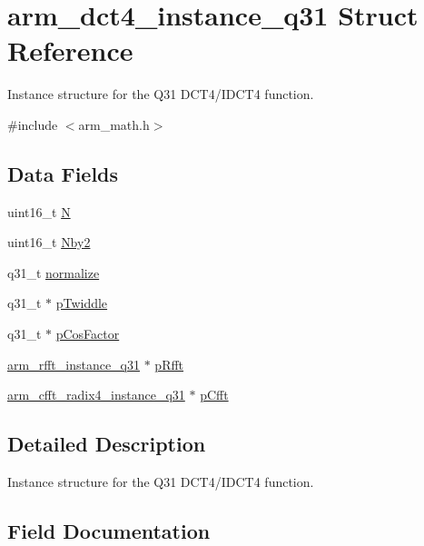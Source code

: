 \hypertarget{structarm__dct4__instance__q31}{}\section{arm\+\_\+dct4\+\_\+instance\+\_\+q31 Struct Reference}
\label{structarm__dct4__instance__q31}


Instance structure for the Q31 D\+C\+T4/\+I\+D\+C\+T4 function.  




{\ttfamily \#include $<$arm\+\_\+math.\+h$>$}

\subsection*{Data Fields}
\begin{DoxyCompactItemize}
\item 
uint16\+\_\+t \hyperlink{structarm__dct4__instance__q31_a37d49571fe35012087153c093705cd11}{N}
\item 
uint16\+\_\+t \hyperlink{structarm__dct4__instance__q31_afa64b1618089e35c2b55cff71cb29715}{Nby2}
\item 
q31\+\_\+t \hyperlink{structarm__dct4__instance__q31_a3a2f571658a202a38fa508098001b47c}{normalize}
\item 
q31\+\_\+t $\ast$ \hyperlink{structarm__dct4__instance__q31_a2505b7d5ec077b244c712797a5253b6d}{p\+Twiddle}
\item 
q31\+\_\+t $\ast$ \hyperlink{structarm__dct4__instance__q31_af06acf18dc6547fc29aba2eb68cc63f0}{p\+Cos\+Factor}
\item 
\hyperlink{structarm__rfft__instance__q31}{arm\+\_\+rfft\+\_\+instance\+\_\+q31} $\ast$ \hyperlink{structarm__dct4__instance__q31_a16c74f8496e1691e62da3c57e0c676eb}{p\+Rfft}
\item 
\hyperlink{structarm__cfft__radix4__instance__q31}{arm\+\_\+cfft\+\_\+radix4\+\_\+instance\+\_\+q31} $\ast$ \hyperlink{structarm__dct4__instance__q31_a0b1f4a05c1824bab3b9bd837a260232a}{p\+Cfft}
\end{DoxyCompactItemize}


\subsection{Detailed Description}
Instance structure for the Q31 D\+C\+T4/\+I\+D\+C\+T4 function. 

\subsection{Field Documentation}
\mbox{\label{structarm__dct4__instance__q31_a37d49571fe35012087153c093705cd11}} 
